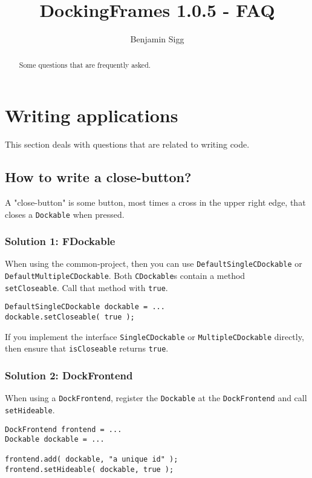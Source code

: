 \documentclass[a4paper,10pt]{article}
\title{DockingFrames 1.0.5 - FAQ}
\author{Benjamin Sigg}
\newcommand{\src}[1]{\lstinline[basicstyle=\normalsize\ttfamily,keywordstyle=\normalsize\ttfamily,identifierstyle=\normalsize\ttfamily]|#1|}
\begin{document}
\maketitle
\tableofcontents
\newpage

\begin{abstract}Some questions that are frequently asked.
\end{abstract}

\section{Writing applications}
This section deals with questions that are related to writing code.
\subsection{How to write a close-button?}
A "close-button" is some button, most times a cross in the upper right edge, that closes a \src{Dockable} when pressed.
\subsubsection{Solution 1: FDockable}
When using the common-project, then you can use \src{DefaultSingleCDockable} or \src{DefaultMultipleCDockable}. Both \src{CDockable}s contain a method \\\src{setCloseable}. Call that method with \src{true}.
\begin{lstlisting}
DefaultSingleCDockable dockable = ...
dockable.setCloseable( true );
\end{lstlisting}
If you implement the interface \src{SingleCDockable} or \src{MultipleCDockable} directly, then ensure that \src{isCloseable} returns \src{true}.

\subsubsection{Solution 2: DockFrontend}
When using a \src{DockFrontend}, register the \src{Dockable} at the \src{DockFrontend} and call \src{setHideable}.
\begin{lstlisting}
DockFrontend frontend = ...
Dockable dockable = ...

frontend.add( dockable, "a unique id" );
frontend.setHideable( dockable, true );
\end{lstlisting}
\end{document}
